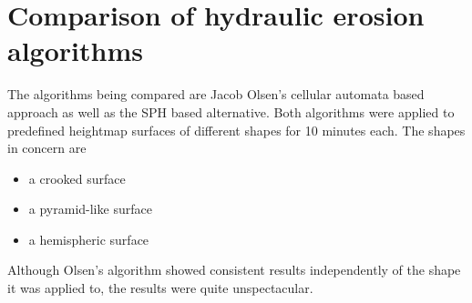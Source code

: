 \documentclass[11pt,a4paper,twoside,openright]{report}
\begin{document}
\section{Comparison of hydraulic erosion algorithms}
The algorithms being compared are Jacob Olsen's cellular automata based approach as well as the SPH based alternative. Both algorithms were applied to predefined heightmap surfaces of different shapes for 10 minutes each. The shapes in concern are
\begin{itemize}
\item a crooked surface
\item a pyramid-like surface
\item a hemispheric surface
\end{itemize}
Although Olsen's algorithm showed consistent results independently of the shape it was applied to, the results were quite unspectacular.
\end{document}
